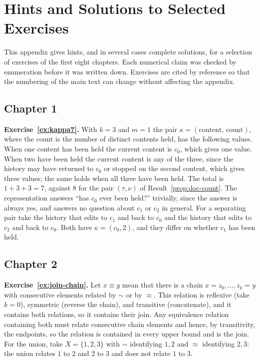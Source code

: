 \chapter{Hints and Solutions to Selected Exercises}\label{app:hints}

This appendix gives hints, and in several cases complete solutions, for a selection of exercises of the first eight chapters. Each numerical claim was checked by enumeration before it was written down. Exercises are cited by reference so that the numbering of the main text can change without affecting the appendix.

\section*{Chapter 1}

\textbf{Exercise~\ref{ex:kappa7}.} With $k=3$ and $m=1$ the pair $\kappa=(\text{content},\,\text{count})$, where the count is the number of distinct contents held, has the following values. When one content has been held the current content is $c_0$, which gives one value. When two have been held the current content is any of the three, since the history may have returned to $c_0$ or stopped on the second content, which gives three values; the same holds when all three have been held. The total is $1+3+3=7$, against $8$ for the pair $(\tau,\nu)$ of Result~\ref{prop:doc-count}. The representation answers ``has $c_0$ ever been held?'' trivially, since the answer is always yes, and answers no question about $c_1$ or $c_2$ in general. For a separating pair take the history that edits to $c_1$ and back to $c_0$ and the history that edits to $c_2$ and back to $c_0$. Both have $\kappa=(c_0,2)$, and they differ on whether $c_1$ has been held.

\section*{Chapter 2}

\textbf{Exercise~\ref{ex:join-chain}.} Let $x\equiv y$ mean that there is a chain $x=z_0,\dots,z_k=y$ with consecutive elements related by $\sim$ or by $\approx$. This relation is reflexive (take $k=0$), symmetric (reverse the chain), and transitive (concatenate), and it contains both relations, so it contains their join. Any equivalence relation containing both must relate consecutive chain elements and hence, by transitivity, the endpoints, so the relation is contained in every upper bound and is the join. For the union, take $X=\{1,2,3\}$ with $\sim$ identifying $1,2$ and $\approx$ identifying $2,3$: the union relates $1$ to $2$ and $2$ to $3$ and does not relate $1$ to $3$.

